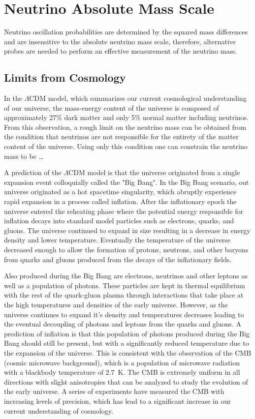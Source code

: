 \section{Neutrino Absolute Mass Scale}

Neutrino oscillation probabilities are determined by the squared mass differences and are insensitive to the absolute neutrino mass scale, therefore, alternative probes are needed to perform an effective measurement of the neutrino mass.

\subsection{Limits from Cosmology}

In the $\Lambda$CDM model, which summarizes our current cosmological understanding of our universe, the mass-energy content of the universe is composed of approximately 27\% dark matter and only 5\% normal matter including neutrinos. From this observation, a rough limit on the neutrino mass can be obtained from the condition that neutrinos are not responsible for the entirety of the matter content of the universe. Using only this condition one can constrain the neutrino mass to be \ldots

A prediction of the $\Lambda$CDM model is that the universe originated from a single expansion event colloquially called the "Big Bang". In the Big Bang scenario, out universe originated as a hot spacetime singularity, which abruptly experience rapid expansion in a process called inflation. After the inflationary epoch the universe entered the reheating phase where the potential energy responsible for inflation decays into standard model particles such as electrons, quarks, and gluons. The universe continued to expand in size resulting in a decrease in energy density and lower temperature. Eventually the temperature of the universe decreased enough to allow the formation of protons, neutrons, and other baryons from quarks and gluons produced from the decays of the inflationary fields.

Also produced during the Big Bang are electrons, neutrinos and other leptons as well as a population of photons. These particles are kept in thermal equilibrium with the rest of the quark-gluon plasma through interactions that take place at the high temperatures and densities of the early universe. However, as the universe continues to expand it's density and temperatures decreases leading to the eventual decoupling of photons and leptons from the quarks and gluons. A prediction of inflation is that this population of photons produced during the Big Bang should still be present, but with a significantly reduced temperature due to the expansion of the universe. This is consistent with the observation of the CMB (cosmic microwave background), which is a population of microwave radiation with a blackbody temperature of 2.7~K. The CMB is extremely uniform in all directions with slight anisotropies that can be analyzed to study the evolution of the early universe. A series of experiments have measured the CMB with increasing levels of precision, which has lead to a significant increase in our current understanding of cosmology.

